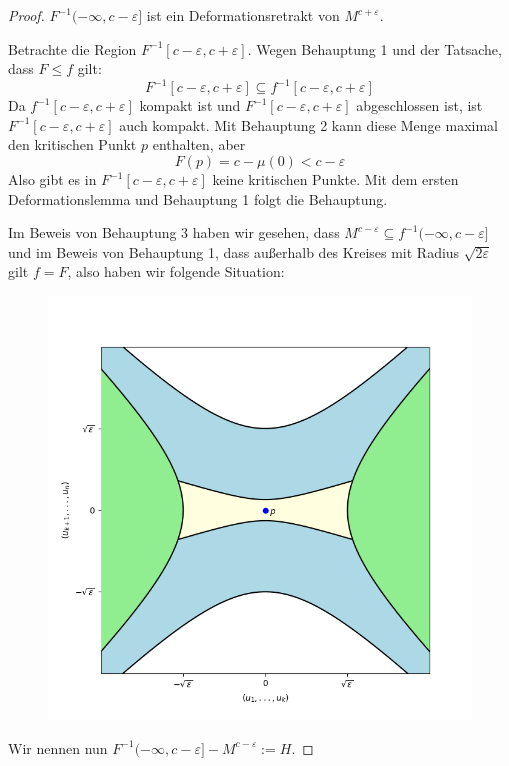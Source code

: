 \begin{proof}
     $F^{-1}(-\infty, c - \varepsilon]$ ist ein
    Deformationsretrakt von $M^{c + \varepsilon}$.

    Betrachte die Region $F^{-1}[c - \varepsilon, c + \varepsilon]$. Wegen 
    Behauptung 1 und der Tatsache, dass $F \leq f$ gilt:
    \[ F^{-1}[c - \varepsilon, c + \varepsilon] \subseteq f^{-1}[c - \varepsilon, c + \varepsilon] \]
    Da $f^{-1}[c - \varepsilon, c + \varepsilon]$ kompakt ist und 
    $F^{-1}[c - \varepsilon, c + \varepsilon]$ abgeschlossen ist, ist 
    $F^{-1}[c - \varepsilon, c + \varepsilon]$ auch kompakt. Mit Behauptung 2
    kann diese Menge maximal den kritischen Punkt $p$ enthalten, aber
    \[ F(p) = c - \mu(0) < c - \varepsilon \]
    Also gibt es in $F^{-1}[c - \varepsilon, c + \varepsilon]$ keine kritischen
    Punkte. Mit dem ersten Deformationslemma und Behauptung 1 folgt die 
    Behauptung.
    \sectiondone

    Im Beweis von Behauptung 3 haben wir gesehen, dass 
    $M^{c - \varepsilon} \subseteq f^{-1}(-\infty, c - \varepsilon]$ und im
    Beweis von Behauptung 1, dass außerhalb des Kreises mit Radius 
    $\sqrt{2 \varepsilon}$ gilt $f = F$, also haben wir folgende Situation:
    
    \begin{figure}[H]
        \centering
        \includegraphics[width=0.8\linewidth]{resources/Me-Diagram7-handle.png}
        \label{fig:me-diagram7}
    \end{figure}

    Wir nennen nun $F^{-1}(-\infty, c-\varepsilon] - M^{c - \varepsilon} := H$.


\end{proof}
